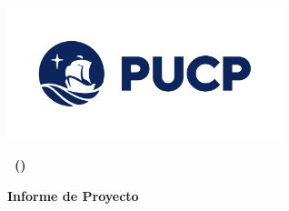 \begin{titlepage}
    \centering
    \vspace*{0.5cm}
    {\Huge\bfseries \college \par}
    \vspace{1cm}
    {\Large\bfseries \faculty \par}
    \vspace{1cm}
    \includegraphics[width=0.6\textwidth]{images/pucp}
    \vspace{2cm}

    {\Large\bfseries \courseTitle\ (\courseCode) \par}
    \vspace{1.5cm}
    {\large\bfseries Informe de Proyecto \par}
    \vspace{2cm}
    \authors
    \vspace{2cm}

    {\large \noteDate \par}
    \vfill
\end{titlepage}